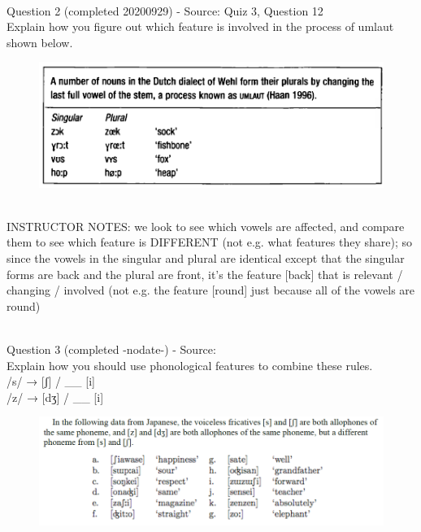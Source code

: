 \documentclass[12pt]{article}
\begin{document}
~\\

{\large Question 2} (completed 20200929) - Source: Quiz 3, Question 12\\

Explain how you figure out which feature is involved in the process of umlaut shown below.\\

\begin{figure}[H]
\includegraphics{../images/dutch.png}
\end{figure}

~\\
INSTRUCTOR NOTES: we look to see which vowels are affected, and compare them to see which feature is DIFFERENT (not e.g. what features they share); so since the vowels in the singular and plural are identical except that the singular forms are back and the plural are front, it's the feature [back] that is relevant / changing / involved (not e.g. the feature [round] just because all of the vowels are round)


~\\

{\large Question 3} (completed -nodate-) - Source: \\

Explain how you should use phonological features to combine these rules.\\

/s/ → {[ʃ]} / \_\_ {[i]} \\/z/ → {[dʒ]} / \_\_ {[i]}

\begin{figure}[H]
\includegraphics{../images/japanese.png}
\end{figure}
\end{document}
